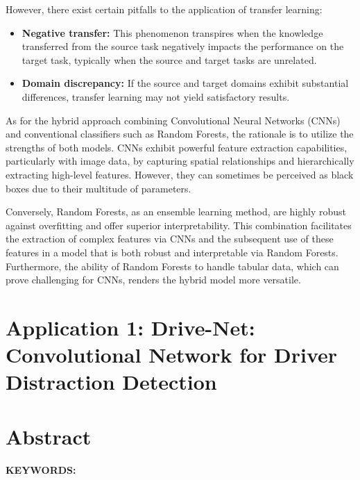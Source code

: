 However, there exist certain pitfalls to the application of transfer learning:

\begin{itemize}
    \item \textbf{Negative transfer:} This phenomenon transpires when the knowledge transferred from the source task negatively impacts the performance on the target task, typically when the source and target tasks are unrelated.
    \item \textbf{Domain discrepancy:} If the source and target domains exhibit substantial differences, transfer learning may not yield satisfactory results.
\end{itemize}

As for the hybrid approach combining Convolutional Neural Networks (CNNs) and conventional classifiers such as Random Forests, the rationale is to utilize the strengths of both models. CNNs exhibit powerful feature extraction capabilities, particularly with image data, by capturing spatial relationships and hierarchically extracting high-level features. However, they can sometimes be perceived as black boxes due to their multitude of parameters.

Conversely, Random Forests, as an ensemble learning method, are highly robust against overfitting and offer superior interpretability. This combination facilitates the extraction of complex features via CNNs and the subsequent use of these features in a model that is both robust and interpretable via Random Forests. Furthermore, the ability of Random Forests to handle tabular data, which can prove challenging for CNNs, renders the hybrid model more versatile.

\section{Application 1: Drive-Net: Convolutional Network for Driver Distraction Detection}\label{ch:drive-net}

\section{Abstract}


\textbf{KEYWORDS:\ } %

\newpage



